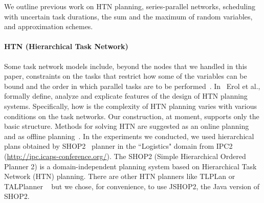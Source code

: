 \documentclass[review]{elsarticle}
\begin{document}
We outline previous work on HTN planning, series-parallel networks, scheduling with uncertain task durations, the sum and the maximum of random variables, and approximation schemes.

\paragraph{HTN (Hierarchical Task Network)} Some task network models include, beyond the nodes that we handled in this paper, constraints on the tasks that restrict how some of the variables can be bound and the order in which parallel tasks are to be performed~\cite{erol1994htn,erol1996complexity, Russell:2003:AIM:773294}. In~\cite{erol1994htn} Erol et al., formally define, analyze and explicate features of the design of HTN planning systems. Specifically, how is the complexity of HTN planning varies with various conditions on the task networks. Our construction, at moment, supports only the basic structure. Methods for solving HTN are suggested as an online planning~\cite{nau1998control, nau2003shop2, gabaldon2002programming} and as offline planning~\cite{kelly2008offline}. In the experiments we conducted, we used hierarchical plans obtained by SHOP2~\cite{nau2003shop2} planner in the ``Logistics" domain from IPC2 (\href{url}{http://ipc.icaps-conference.org/}). The SHOP2 (Simple Hierarchical Ordered Planner 2) is a domain-independent planning system based on Hierarchical Task Network (HTN) planning. There are other HTN planners like TLPLan or TALPlanner ~\cite{kvarnstrom2000talplanner} but we chose, for convenience, to use JSHOP2, the Java version of SHOP2.
\end{document}
